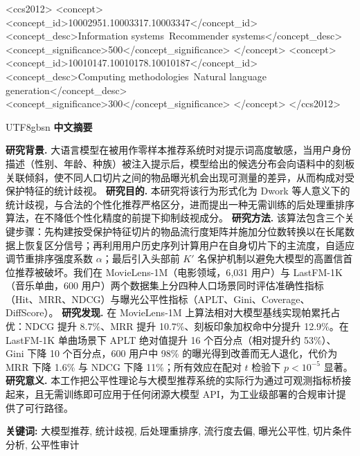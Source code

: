 \documentclass[sigconf,review,anonymous]{acmart}
\begin{document}
\begin{CCSXML}
<ccs2012>
   <concept>
       <concept_id>10002951.10003317.10003347</concept_id>
       <concept_desc>Information systems~Recommender systems</concept_desc>
       <concept_significance>500</concept_significance>
   </concept>
   <concept>
       <concept_id>10010147.10010178.10010187</concept_id>
       <concept_desc>Computing methodologies~Natural language generation</concept_desc>
       <concept_significance>300</concept_significance>
   </concept>
</ccs2012>
\end{CCSXML}



\maketitle

\begin{CJK}{UTF8}{gbsn}
\noindent\textbf{中文摘要}\medskip

\noindent\textbf{研究背景.} 大语言模型在被用作零样本推荐系统时对提示词高度敏感，当用户身份描述（性别、年龄、种族）被注入提示后，模型给出的候选分布会向语料中的刻板关联倾斜，使不同人口切片之间的物品曝光机会出现可测量的差异，从而构成对受保护特征的统计歧视。
\textbf{研究目的.} 本研究将该行为形式化为 Dwork 等人意义下的统计歧视，与合法的个性化推荐严格区分，进而提出一种无需训练的后处理重排序算法，在不降低个性化精度的前提下抑制歧视成分。
\textbf{研究方法.} 该算法包含三个关键步骤：先构建按受保护特征切片的物品流行度矩阵并施加分位数转换以在长尾数据上恢复区分信号；再利用用户历史序列计算用户在自身切片下的主流度，自适应调节重排序强度系数 $\alpha$；最后引入头部前 $K'$ 名保护机制以避免大模型的高置信首位推荐被破坏。我们在 MovieLens-1M（电影领域，6{,}031 用户）与 LastFM-1K（音乐单曲，600 用户）两个数据集上分四种人口场景同时评估准确性指标（Hit、MRR、NDCG）与曝光公平性指标（APLT、Gini、Coverage、DiffScore）。
\textbf{研究发现.} 在 MovieLens-1M 上算法相对大模型基线实现帕累托占优：NDCG 提升 8.7\%、MRR 提升 10.7\%、刻板印象加权命中分提升 12.9\%。在 LastFM-1K 单曲场景下 APLT 绝对值提升 16 个百分点（相对提升约 53\%）、Gini 下降 10 个百分点，600 用户中 98\% 的曝光得到改善而无人退化，代价为 MRR 下降 1.6\% 与 NDCG 下降 11\%；所有效应在配对 $t$ 检验下 $p < 10^{-5}$ 显著。
\textbf{研究意义.} 本工作把公平性理论与大模型推荐系统的实际行为通过可观测指标桥接起来，且无需训练即可应用于任何闭源大模型 API，为工业级部署的合规审计提供了可行路径。

\noindent\textbf{关键词:} 大模型推荐, 统计歧视, 后处理重排序, 流行度去偏, 曝光公平性, 切片条件分析, 公平性审计
\end{CJK}
\end{document}
